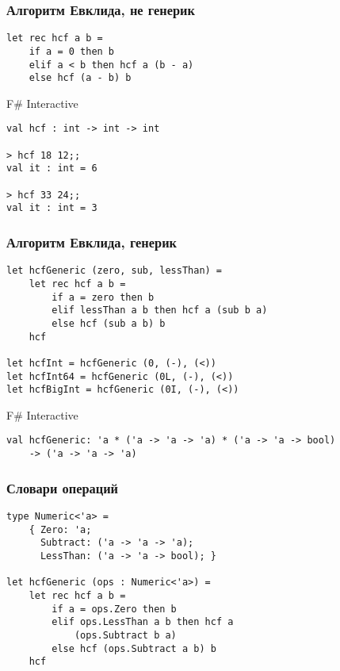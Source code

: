 \documentclass{../../slides-style}
\begin{document}
    \begin{frame}[fragile]
        \frametitle{Алгоритм Евклида, не генерик}
        \begin{verbatim}
let rec hcf a b =
    if a = 0 then b
    elif a < b then hcf a (b - a)
    else hcf (a - b) b
        \end{verbatim}

        \begin{alertblock}{F\# Interactive}
            \begin{verbatim}
val hcf : int -> int -> int

> hcf 18 12;;
val it : int = 6

> hcf 33 24;;
val it : int = 3
            \end{verbatim}
        \end{alertblock}
    \end{frame}

    \begin{frame}[fragile]
        \frametitle{Алгоритм Евклида, генерик}
        \begin{verbatim}
let hcfGeneric (zero, sub, lessThan) =
    let rec hcf a b =
        if a = zero then b
        elif lessThan a b then hcf a (sub b a)
        else hcf (sub a b) b
    hcf    
    
let hcfInt = hcfGeneric (0, (-), (<))
let hcfInt64 = hcfGeneric (0L, (-), (<))
let hcfBigInt = hcfGeneric (0I, (-), (<))
        \end{verbatim}

        \begin{alertblock}{F\# Interactive}
            \begin{verbatim}
val hcfGeneric: 'a * ('a -> 'a -> 'a) * ('a -> 'a -> bool) 
    -> ('a -> 'a -> 'a)
            \end{verbatim}
        \end{alertblock}
    \end{frame}

    \begin{frame}[fragile]
        \frametitle{Словари операций}
        \begin{verbatim}
type Numeric<'a> =
    { Zero: 'a;
      Subtract: ('a -> 'a -> 'a);
      LessThan: ('a -> 'a -> bool); }

let hcfGeneric (ops : Numeric<'a>) =
    let rec hcf a b =
        if a = ops.Zero then b
        elif ops.LessThan a b then hcf a 
            (ops.Subtract b a)
        else hcf (ops.Subtract a b) b
    hcf
        \end{verbatim}
    \end{frame}
\end{document}
